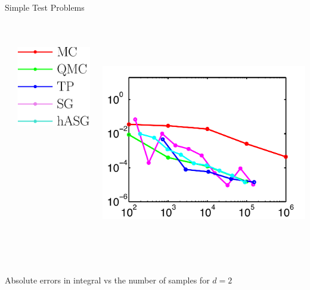 \documentclass[final]{beamer}
\begin{document}
\begin{frame}{}
{\begin{columns}[t]
\begin{column}{.30\linewidth}
\begin{block}{\centering Simple Test Problems}
\begin{columns}[T]
\begin{column}{12cm}{}
\end{column}
\begin{column}{4cm}{}
\vspace{2cm}
\centering\includegraphics[height=5cm,width=5cm]{figures/legend}\\
\end{column}
\begin{column}{14cm}{}
\includegraphics[height=10cm, width = 14cm]{figures/maxgaussian2errors}\\
\end{column}
\end{columns}
\vspace{0.5em}
\centering\scriptsize{Absolute errors in integral vs the number of samples for $d=2$}


\end{block}
\end{column}
\end{columns}}
\end{frame}
\end{document}
